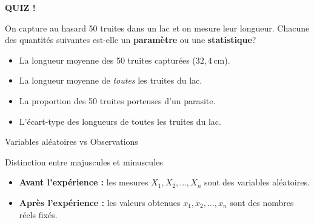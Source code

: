 \documentclass{BeamerTemplate}
\begin{document}
\begin{frame}[plain,t]
  \centerline{\LARGE\bfseries\alert{QUIZ !}}

  \medskip
  On capture au hasard 50 truites dans un lac et on mesure leur longueur. Chacune des quantités suivantes est-elle un \textbf{paramètre} ou une \textbf{statistique}?
  \begin{itemize}\itemsep 5mm
    \item La longueur moyenne des 50 truites capturées ($32{,}4$\,cm).\\
    \item La longueur moyenne de \emph{toutes} les truites du lac.\\
    \item La proportion des 50 truites porteuses d'un parasite.\\
    \item L'écart-type des longueurs de toutes les truites du lac.\\
  \end{itemize}
\end{frame}

\begin{frame}[t]{Variables aléatoires vs Observations}
  \small
  \begin{Boite}{Distinction entre majuscules et minuscules}
    \begin{itemize}
      \item \textbf{Avant l'expérience :} les mesures $X_1, X_2, \ldots, X_n$ sont des \alert{variables aléatoires}.
      \item \textbf{Après l'expérience :} les valeurs obtenues $x_1, x_2, \ldots, x_n$ sont des \alert{nombres réels} fixés.
    \end{itemize}
  \end{Boite}

  \smallskip

  \smallskip
\end{frame}
\end{document}
